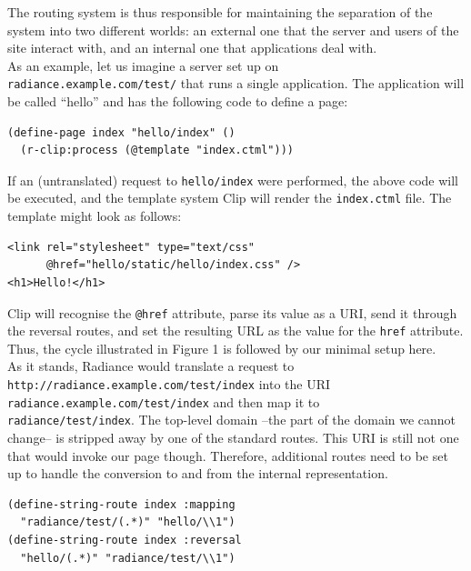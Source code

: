 \documentclass{sig-alternate}
\begin{document}
The routing system is thus responsible for maintaining the separation of the system into two different worlds: an external one that the server and users of the site interact with, and an internal one that applications deal with. \\

As an example, let us imagine a server set up on \\ \texttt{radiance.example.com/test/} that runs a single application. The application will be called ``hello'' and has the following code to define a page:

\begin{verbatim}
(define-page index "hello/index" ()
  (r-clip:process (@template "index.ctml")))
\end{verbatim}

If an (untranslated) request to \texttt{hello/index} were performed, the above code will be executed, and the template system Clip\cite{clip} will render the \texttt{index.ctml} file. The template might look as follows:

\begin{verbatim}
<link rel="stylesheet" type="text/css"
      @href="hello/static/hello/index.css" />
<h1>Hello!</h1>
\end{verbatim}

Clip will recognise the \texttt{@href} attribute, parse its value as a URI, send it through the reversal routes, and set the resulting URL as the value for the \texttt{href} attribute. Thus, the cycle illustrated in Figure 1 is followed by our minimal setup here. \\

As it stands, Radiance would translate a request to \\\texttt{http://radiance.example.com/test/index} into the URI \\\texttt{radiance.example.com/test/index} and then map it to \\\texttt{radiance/test/index}. The top-level domain --the part of the domain we cannot change-- is stripped away by one of the standard routes. This URI is still not one that would invoke our page though. Therefore, additional routes need to be set up to handle the conversion to and from the internal representation.

\begin{verbatim}
(define-string-route index :mapping 
  "radiance/test/(.*)" "hello/\\1")
(define-string-route index :reversal
  "hello/(.*)" "radiance/test/\\1")
\end{verbatim}
\end{document}
